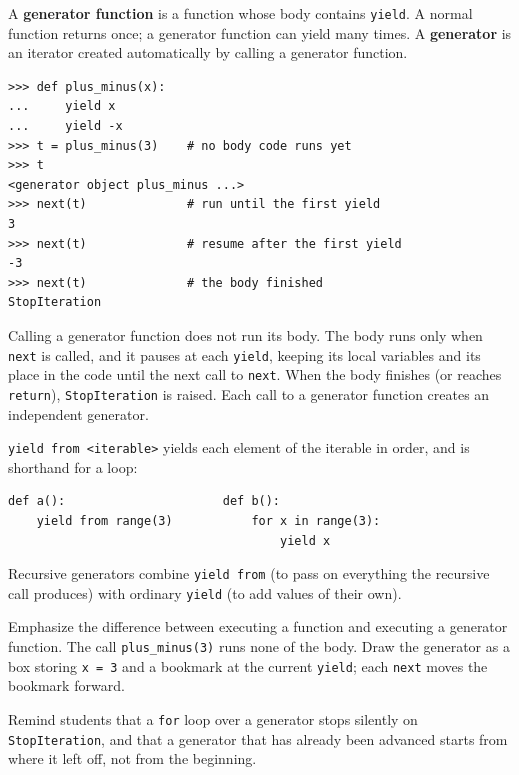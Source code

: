 A \textbf{generator function} is a function whose body contains \lstinline{yield}. A normal function returns once; a generator function can yield many times. A \textbf{generator} is an iterator created automatically by calling a generator function.

\begin{lstlisting}
>>> def plus_minus(x):
...     yield x
...     yield -x
>>> t = plus_minus(3)    # no body code runs yet
>>> t
<generator object plus_minus ...>
>>> next(t)              # run until the first yield
3
>>> next(t)              # resume after the first yield
-3
>>> next(t)              # the body finished
StopIteration
\end{lstlisting}

Calling a generator function does not run its body. The body runs only when \lstinline{next} is called, and it pauses at each \lstinline{yield}, keeping its local variables and its place in the code until the next call to \lstinline{next}. When the body finishes (or reaches \lstinline{return}), \lstinline{StopIteration} is raised. Each call to a generator function creates an independent generator.

\lstinline{yield from <iterable>} yields each element of the iterable in order, and is shorthand for a loop:
\begin{lstlisting}
def a():                      def b():
    yield from range(3)           for x in range(3):
                                      yield x
\end{lstlisting}
Recursive generators combine \lstinline{yield from} (to pass on everything the recursive call produces) with ordinary \lstinline{yield} (to add values of their own).

\begin{meta}
Emphasize the difference between executing a function and executing a generator function. The call \lstinline{plus_minus(3)} runs none of the body. Draw the generator as a box storing \lstinline{x = 3} and a bookmark at the current \lstinline{yield}; each \lstinline{next} moves the bookmark forward.

Remind students that a \lstinline{for} loop over a generator stops silently on \lstinline{StopIteration}, and that a generator that has already been advanced starts from where it left off, not from the beginning.
\end{meta}
